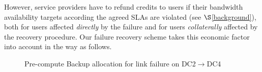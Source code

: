 \documentclass[sigconf]{acmart}
\begin{document}
However, service providers have to refund credits to users if their bandwidth availability targets according the agreed SLAs are violated (see $\S$\ref{background}), both for users affected \textit{directly} by the failure and for users \textit{collaterally} affected by the recovery procedure. 
Our failure recovery scheme takes this economic factor into account in the way as follows.
%
%
%
\begin{figure}[t]
\centering
{}
\caption{Pre-compute Backup allocation for link failure on DC2$\to$DC4}
\label{recovery}
\end{figure}
\end{document}
